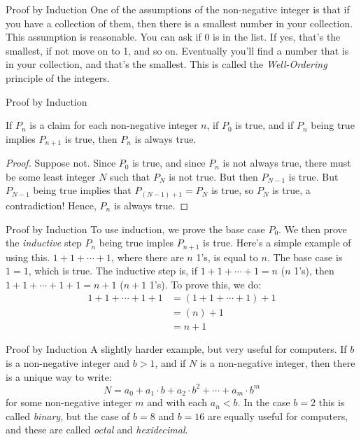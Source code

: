 \documentclass{beamer}
\begin{document}
    \begin{frame}{Proof by Induction}
        One of the assumptions of the non-negative integer is that if you have a
        collection of them, then there is a smallest number in your collection.
        This assumption is reasonable. You can ask if 0 is in the list. If yes, that's
        the smallest, if not move on to 1, and so on. Eventually you'll find a number that
        is in your collection, and that's the smallest. This is called the
        \textit{Well-Ordering} principle of the integers.
    \end{frame}
    \begin{frame}{Proof by Induction}
        \begin{theorem}
            If $P_{n}$ is a claim for each non-negative integer $n$, if
            $P_{0}$ is true, and if $P_{n}$ being true implies $P_{n+1}$ is true,
            then $P_{n}$ is always true.
        \end{theorem}
        \begin{proof}
            Suppose not. Since $P_{0}$ is true, and since $P_{n}$ is not always true,
            there must be some least integer $N$ such that $P_{N}$ is not true. But then
            $P_{N-1}$ is true. But $P_{N-1}$ being true implies that
            $P_{(N-1)+1}=P_{N}$ is true, so $P_{N}$ is true, a contradiction! Hence,
            $P_{n}$ is always true.
        \end{proof}
    \end{frame}
    \begin{frame}{Proof by Induction}
        To use induction, we prove the base case $P_{0}$. We then prove the
        \textit{inductive} step $P_{n}$ being true imples $P_{n+1}$ is true.
        Here's a simple example of using this.
        $1+1+\cdots+1$, where there are $n$ 1's, is equal to $n$. The base case is
        $1=1$, which is true. The inductive step is, if
        $1+1+\cdots+1=n$ ($n$ 1's), then $1+1+\cdots+1+1=n+1$ ($n+1$ 1's). To prove this,
        we do:
        \begin{align}
            1+1+\cdots+1+1&=(1+1+\cdots+1)+1\\
                &=(n)+1\\
                &=n+1
        \end{align}
    \end{frame}
    \begin{frame}{Proof by Induction}
        A slightly harder example, but very useful for computers.
        If $b$ is a non-negative integer and $b>1$, and if $N$ is a non-negative integer,
        then there is a unique way to write:
        \begin{equation}
            N=a_{0} + a_{1}\cdot{b} + a_{2}\cdot{b}^{2}+\cdots+a_{m}\cdot{b}^{m}
        \end{equation}
        for some non-negative integer $m$ and with each $a_{n}<b$. In the case $b=2$ this is called
        \textit{binary}, but the case of $b=8$ and $b=16$ are equally useful for computers, and
        these are called \textit{octal} and \textit{hexidecimal}.
    \end{frame}
\end{document}
